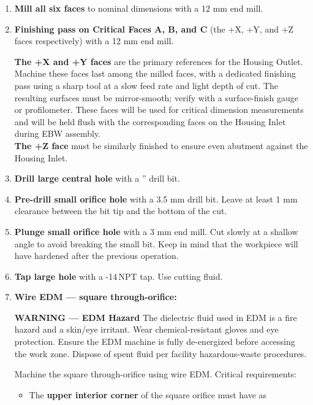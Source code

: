 \documentclass[12pt, letterpaper]{report}%
\begin{document}
\begin{appendices}
	\begin{enumerate}[itemsep=4pt]
		\item \textbf{Mill all six faces} to nominal dimensions with a 12 mm end mill.
		\item \textbf{Finishing pass on Critical Faces A, B, and C}
					(the $+$X, $+$Y, and $+$Z faces respectively) with a 12 mm end mill.
					\begin{notebox}
					\textbf{The +X and +Y faces} are the primary references for the Housing Outlet.
					Machine these faces last among the milled faces, with a dedicated finishing pass
					using a sharp tool at a slow feed rate and light depth of cut.
					The resulting surfaces must be mirror-smooth; verify with a surface-finish
					gauge or profilometer. These faces will be used for critical dimension measurements
					and will be held flush with the corresponding faces on the Housing Inlet
					during EBW assembly. \\
					\textbf{The +Z face} must be similarly finished to ensure even abutment against the Housing Inlet.
					\end{notebox}
		\item \textbf{Drill large central hole} with a '' drill bit.
		\item \textbf{Pre-drill small orifice hole} with a 3.5 mm drill bit. Leave at least 1 mm clearance between the bit tip and the bottom of the cut.
		\item \textbf{Plunge small orifice hole} with a 3 mm end mill. Cut slowly at a shallow angle to avoid breaking the small bit.
					Keep in mind that the workpiece will have hardened after the previous operation.
		\item \textbf{Tap large hole} with a -14\,NPT tap. Use cutting fluid.
		\item \textbf{Wire EDM --- square through-orifice:}
					\begin{warningbox}
					\textbf{\textcolor{warnred}{WARNING --- EDM Hazard}}
					The dielectric fluid used in EDM is a fire hazard and a skin/eye irritant.
					Wear chemical-resistant gloves and eye protection. Ensure the EDM machine is
					fully de-energized before accessing the work zone. Dispose of spent fluid per
					facility hazardous-waste procedures.
					\end{warningbox}
					Machine the square through-orifice using wire EDM.
					Critical requirements:
					\begin{itemize}[itemsep=2pt]
						\item The \textbf{upper interior corner} of the square orifice must have as

\end{itemize}
\end{enumerate}
\end{appendices}
\end{document}
